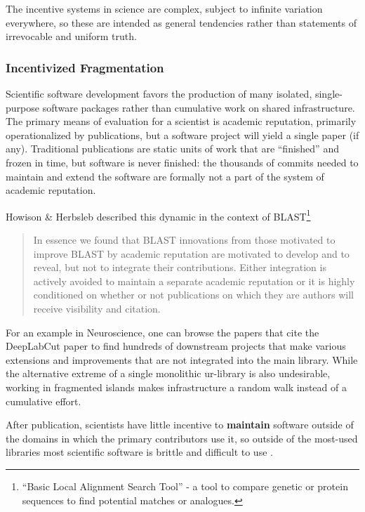 \documentclass[10pt]{article}
\begin{document}
\begin{multicols}{2}
 The incentive systems in science are complex, subject to
infinite variation everywhere, so these are intended as general
tendencies rather than statements of irrevocable and uniform truth.

\hypertarget{incentivized-fragmentation}{%
\subsubsection{Incentivized
Fragmentation}\label{incentivized-fragmentation}}

Scientific software development favors the production of many isolated,
single-purpose software packages rather than cumulative work on shared
infrastructure. The primary means of evaluation for a scientist is
academic reputation, primarily operationalized by publications, but a
software project will yield a single paper (if any). Traditional
publications are static units of work that are ``finished'' and frozen
in time, but software is never finished: the thousands of commits needed
to maintain and extend the software are formally not a part of the
system of academic reputation.

Howison \& Herbsleb described this dynamic in the context of
BLAST\footnote{``Basic Local Alignment Search Tool'' - a tool to compare
  genetic or protein sequences to find potential matches or analogues.}

\begin{quote}
In essence we found that BLAST innovations from those motivated to
improve BLAST by academic reputation are motivated to develop and to
reveal, but not to integrate their contributions. Either integration is
actively avoided to maintain a separate academic reputation or it is
highly conditioned on whether or not publications on which they are
authors will receive visibility and citation. \cite{howisonIncentivesIntegrationScientific2013} 
\end{quote}

For an example in Neuroscience, one can browse the papers that cite the
DeepLabCut paper \cite{mathisDeepLabCutMarkerlessPose2018a}  to
find hundreds of downstream projects that make various extensions and
improvements that are not integrated into the main library. While the
alternative extreme of a single monolithic ur-library is also
undesirable, working in fragmented islands makes infrastructure a random
walk instead of a cumulative effort.

After publication, scientists have little incentive to \textbf{maintain}
software outside of the domains in which the primary contributors use
it, so outside of the most-used libraries most scientific software is
brittle and difficult to use \cite{mangulImprovingUsabilityArchival2019, kumarBioinformaticsSoftwareBiologists2007} .


\end{multicols}
\end{document}
